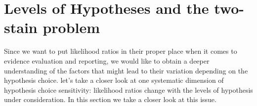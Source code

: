 \documentclass[
  10pt,
  dvipsnames,enabledeprecatedfontcommands]{scrartcl}
\begin{document}
\hypertarget{levels-of-hypotheses-and-the-two-stain-problem}{%
\section{Levels of Hypotheses and the two-stain
problem}\label{levels-of-hypotheses-and-the-two-stain-problem}}

\label{sec:lhTwoSTain}

Since we want to put likelihood ratios in their proper place when it
comes to evidence evaluation and reporting, we would like to obtain a
deeper understanding of the factors that might lead to their variation
depending on the hypothesis choice. let's take a closer look at one
systematic dimension of hypothesis choice sensitivity: likelihood ratios
change with the levels of hypothesis under consideration. In this
section we take a closer look at this issue.
\end{document}
